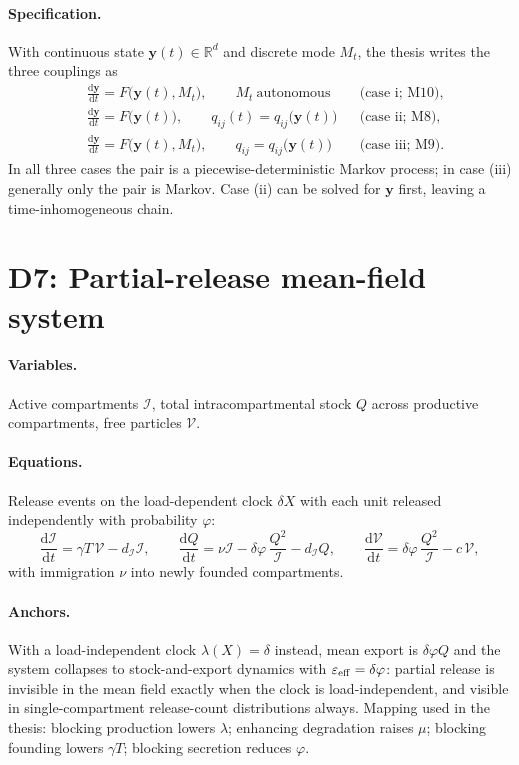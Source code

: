 \documentclass[11pt,a4paper]{report}
\newcommand{\dd}{\mathrm{d}}
\newcommand{\ddt}[1]{\frac{\dd #1}{\dd t}}
\newcommand{\dda}[2]{\frac{\dd #1}{\dd #2}}
\newcommand{\Act}{\mathcal{I}}     %
\newcommand{\Free}{\mathcal{V}}    %
\newcommand{\source}[1]{\par\noindent{\small\textit{Specified in #1.}}\par\medskip}
\begin{document}
\paragraph{Specification.} With continuous state $\mathbf y(t)\in\mathbb R^d$
and discrete mode $M_t$, the thesis writes the three couplings as
\begin{align}
&\dda{\mathbf y}{t}=F\bigl(\mathbf y(t),M_t\bigr),
\qquad M_t\ \text{autonomous}
&&\text{(case i; M10)},\\
&\dda{\mathbf y}{t}=F\bigl(\mathbf y(t)\bigr),
\qquad q_{ij}(t)=q_{ij}\bigl(\mathbf y(t)\bigr)
&&\text{(case ii; M8)},\\
&\dda{\mathbf y}{t}=F\bigl(\mathbf y(t),M_t\bigr),
\qquad q_{ij}=q_{ij}\bigl(\mathbf y(t)\bigr)
&&\text{(case iii; M9)}.
\end{align}
In all three cases the pair is a piecewise-deterministic Markov process;
in case (iii) generally only the pair is Markov. Case (ii) can be solved
for $\mathbf y$ first, leaving a time-inhomogeneous chain.

\section{D7: Partial-release mean-field system}
\source{\S6.7.2}

\paragraph{Variables.} Active compartments $\Act$, total intracompartmental
stock $Q$ across productive compartments, free particles $\Free$.

\paragraph{Equations.} Release events on the load-dependent clock $\delta X$
with each unit released independently with probability $\varphi$:
\begin{equation}
\ddt{\Act}=\gamma T\,\Free-d_{\Act}\Act,
\qquad
\ddt{Q}=\nu\Act-\delta\varphi\,\frac{Q^2}{\Act}-d_{\Act}Q,
\qquad
\ddt{\Free}=\delta\varphi\,\frac{Q^2}{\Act}-c\,\Free,
\end{equation}
with immigration $\nu$ into newly founded compartments.

\paragraph{Anchors.} With a load-independent clock $\lambda(X)=\delta$
instead, mean export is $\delta\varphi Q$ and the system collapses to
stock-and-export dynamics with $\varepsilon_{\rm eff}=\delta\varphi$:
partial release is invisible in the mean field exactly when the clock is
load-independent, and visible in single-compartment release-count
distributions always. Mapping used in the thesis: blocking production
lowers $\lambda$; enhancing degradation raises $\mu$; blocking founding
lowers $\gamma T$; blocking secretion reduces $\varphi$.
\end{document}
